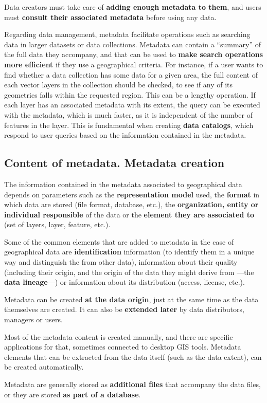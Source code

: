Data creators must take care of \textbf{adding enough metadata to them}, and users must \textbf{consult their associated metadata} before using any data.

Regarding data management, metadata facilitate operations such as searching data in larger datasets or data collections. Metadata can contain a ``summary'' of the full data they accompany, and that can be used to \textbf{make search operations more efficient} if they use a geographical criteria. For instance, if a user wants to find whether a data collection has some data for a given area, the full content of each vector layers in the collection should be checked, to see if any of its geometries falls within the requested region. This can be a lengthy operation. If each layer has an associated metadata with its extent, the query can be executed with the metadata, which is much faster, as it is independent of the number of features in the layer. This is fundamental when creating \textbf{data catalogs}, which respond to user queries based on the information contained in the metadata.


\subsection{Content of metadata. Metadata creation}

The information contained in the metadata associated to geographical data depends on parameters such as the \textbf{representation model} used, the \textbf{format} in which data are stored (file format, database, etc.), the \textbf{organization, entity or individual responsible} of the data or the \textbf{element they are associated to} (set of layers, layer, feature, etc.).

Some of the common elements that are added to metadata in the case of geographical data are \textbf{identification} information (to identify them in a unique way and distinguish the from other data), information about their quality (including their origin, and the origin of the data they might derive from ---the \textbf{data lineage}---) or information about its distribution (access, license, etc.).
 
Metadata can be created \textbf{at the data origin}, just at the same time as the data themselves are created. It can also be \textbf{extended later} by data distributors, managers or users.

Most of the metadata content is created manually, and there are specific applications for that, sometimes connected to desktop GIS tools. Metadata elements that can be extracted from the data itself (such as the data extent), can be created automatically.

Metadata are generally stored as \textbf{additional files} that accompany the data files, or they are stored \textbf{as part of a database}.


\pagestyle{empty}
